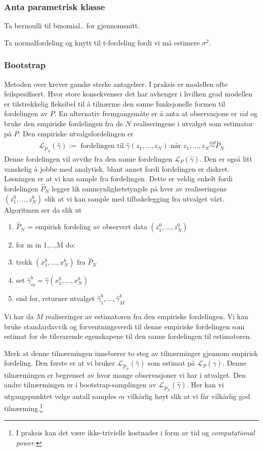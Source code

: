 \subsubsection{Anta parametrisk klasse}
Ta bernoulli til binomial.. for gjennomsnitt.

Ta normalfordeling og knytt til t-fordeling fordi vi må estimere $\sigma^2$. 
\subsubsection{Bootstrap}
Metoden over krever ganske sterke antagelser. I praksis er modellen ofte feilspesifisert. Hvor store konsekvenser det har avhenger i hvilken grad modellen er tilstrekkelig fleksibel til å tilnærme den sanne funksjonelle formen til fordelingen av $P$. En alternativ fremgangsmåte er å anta at observasjone er $iid$ og bruke den empiriske fordelingen fra de $N$ realiseringene i utvalget som estimator på $P$. Den empiriske utvalgsfordelingen er
\begin{align}
\mathcal{L}_{\hat{P}_N}(\hat{\gamma}) := \text{ fordelingen til }\hat{\gamma}(z_1,...,z_N) \text{ når } z_1,...,z_N \overset{iid}{\sim} \hat{P}_N
\end{align}
Denne fordelingen vil avvike fra den sanne fordelingen $\mathcal{L}_{P}(\hat{\gamma})$. Den er også litt vanskelig å jobbe med analytisk, blant annet fordi fordelingen er diskret. Løsningen er at vi kan sample fra fordelingen. Dette er veldig enkelt fordi fordelingen $\hat{P}_N$ legger lik sannsynlighetstyngde på hver av realiseringene $(z_1^0,...,z_N^0)$ slik at vi kan sample med tilbakelegging fra utvalget vårt. Algoritmen ser da slik ut
\begin{enumerate}
\item $\hat{P}_N$ = empirisk fordeling av observert data $(z_1^0,...,z_N^0)$
\item for m in 1,...,M do:
\item trekk $(x_1^b,...,x_N^b)$ fra $\hat{P}_N$
\item set $\hat{\gamma}_m^b= \hat{\gamma}(x_1^b,...,x_N^b)$
\item end for, returner utvalget $\hat{\gamma}_1^b,..., \hat{\gamma}_M^b$
\end{enumerate}
Vi har da $M$ realiseringer av estimatoren fra den empiriske fordelingen. Vi kan bruke standardavvik og forventningsverdi til denne empiriske fordelingen som estimat for de tilsvarende egenskapene til den sanne fordelingen til estimatoren. 

Merk at denne tilnærmingen innebærer to steg av tilnærminger gjennom empirisk fordeling. Den første er at vi bruker $\mathcal{L}_{\hat{P}_N}(\hat{\gamma})$ som estimat på $\mathcal{L}_{P}(\hat{\gamma})$. Denne tilnærmingen er begrenset av hvor mange observasjoner vi har i utvalget. Den andre tilnærmingen er i bootstrap-samplingen av $\mathcal{L}_{\hat{P}_N}(\hat{\gamma})$. Her kan vi utgangspunktet velge antall samples $m$ vilkårlig høyt slik at vi får vilkårlig god tilnærming.\footnote{I praksis kan det være ikke-trivielle kostnader i form av tid og \textit{computational power}.}
